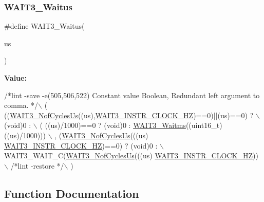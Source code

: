 \mbox{\label{group___w_a_i_t3__module_ga3dbe29b13d5de3927ca05983aaa03d86}} 
\subsubsection{\texorpdfstring{W\+A\+I\+T3\+\_\+\+Waitus}{WAIT3\_Waitus}}
{\footnotesize\ttfamily \#define W\+A\+I\+T3\+\_\+\+Waitus(\begin{DoxyParamCaption}\item[{}]{us }\end{DoxyParamCaption})}

{\bfseries Value\+:}
\begin{DoxyCode}
\textcolor{comment}{/*lint -save -e(505,506,522) Constant value Boolean, Redundant left argument to comma. */}\(\backslash\)
       (  ((\hyperlink{group___w_a_i_t3__module_ga59aa53bfa203bca55c6cc0fee91ab3f3}{WAIT3\_NofCyclesUs}((us),\hyperlink{group___w_a_i_t3__module_ga704e840528cb3515b38c088da7dcf5e7}{WAIT3\_INSTR\_CLOCK\_HZ})==0)||(us)==0)
       ? \(\backslash\)
          (\textcolor{keywordtype}{void})0 : \(\backslash\)
          ( ((us)/1000)==0 ? (void)0 : \hyperlink{group___w_a_i_t3__module_ga19ada606148b3ddfb0bce574e8932ae8}{WAIT3\_Waitms}((uint16\_t)((us)/1000))) \(\backslash\)
          , (\hyperlink{group___w_a_i_t3__module_ga59aa53bfa203bca55c6cc0fee91ab3f3}{WAIT3\_NofCyclesUs}(((us)%
      \hyperlink{group___w_a_i_t3__module_ga704e840528cb3515b38c088da7dcf5e7}{WAIT3\_INSTR\_CLOCK\_HZ})==0) ? (\textcolor{keywordtype}{void})0 : \(\backslash\)
            WAIT3\_WAIT\_C(\hyperlink{group___w_a_i_t3__module_ga59aa53bfa203bca55c6cc0fee91ab3f3}{WAIT3\_NofCyclesUs}(((us)%
      \hyperlink{group___w_a_i_t3__module_ga704e840528cb3515b38c088da7dcf5e7}{WAIT3\_INSTR\_CLOCK\_HZ})) \(\backslash\)
       \textcolor{comment}{/*lint -restore */}\(\backslash\)
       )
\end{DoxyCode}


\subsection{Function Documentation}
\mbox{\label{group___w_a_i_t3__module_ga0d401ca6ca297b5b7a450deed0c42b78}} 
